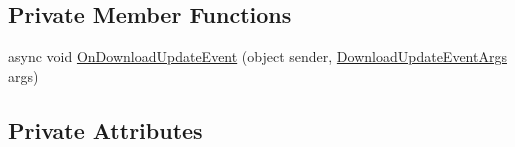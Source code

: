 \subsection*{Private Member Functions}
\begin{DoxyCompactItemize}
\item 
async void \mbox{\hyperlink{class_little_weeb_library_1_1_services_1_1_download_web_socket_service_a3111908b7f7a133a80ab6ec3e81cdcbf}{On\+Download\+Update\+Event}} (object sender, \mbox{\hyperlink{class_little_weeb_library_1_1_event_arguments_1_1_download_update_event_args}{Download\+Update\+Event\+Args}} args)
\end{DoxyCompactItemize}
\subsection*{Private Attributes}
